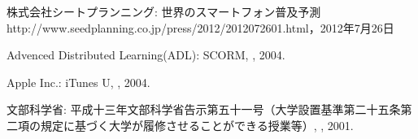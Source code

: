 \begin{bib}[100]


  株式会社シートプランニング:
  \newblock 世界のスマートフォン普及予測
  \newblock http://www.seedplanning.co.jp/press/2012/2012072601.html，2012年7月26日

  Advenced Distributed Learning(ADL):
  \newblock SCORM,
  , 2004.
  
  Apple Inc.:
  \newblock iTunes U,
  , 2004. 
 
  文部科学省:
  \newblock 平成十三年文部科学省告示第五十一号（大学設置基準第二十五条第二項の規定に基づく大学が履修させることができる授業等）,
  , 2001.

\end{bib}
